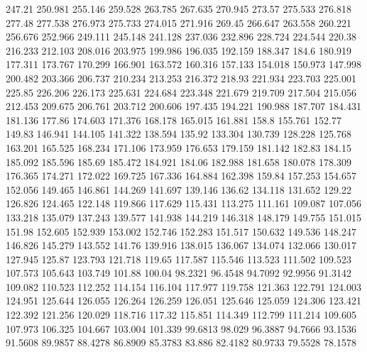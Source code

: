 247.21      250.981      255.146      259.528      263.785      267.635      270.945      273.57      275.533      276.818      277.48      277.538      276.973      275.733      274.015      271.916      269.45      266.647      263.558      260.221      256.676      252.966      249.111      245.148      241.128      237.036      232.896      228.724      224.544      220.38      216.233      212.103      208.016      203.975      199.986      196.035      192.159      188.347      184.6      180.919      177.311      173.767      170.299      166.901      163.572      160.316      157.133      154.018      150.973      147.998      
200.482      203.366      206.737      210.234      213.253      216.372      218.93      221.934      223.703      225.001      225.85      226.206      226.173      225.631      224.684      223.348      221.679      219.709      217.504      215.056      212.453      209.675      206.761      203.712      200.606      197.435      194.221      190.988      187.707      184.431      181.136      177.86      174.603      171.376      168.178      165.015      161.881      158.8      155.761      152.77      149.83      146.941      144.105      141.322      138.594      135.92      133.304      130.739      128.228      125.768      
163.201      165.525      168.234      171.106      173.959      176.653      179.159      181.142      182.83      184.15      185.092      185.596      185.69      185.472      184.921      184.06      182.988      181.658      180.078      178.309      176.365      174.271      172.022      169.725      167.336      164.884      162.398      159.84      157.253      154.657      152.056      149.465      146.861      144.269      141.697      139.146      136.62      134.118      131.652      129.22      126.826      124.465      122.148      119.866      117.629      115.431      113.275      111.161      109.087      107.056      
133.218      135.079      137.243      139.577      141.938      144.219      146.318      148.179      149.755      151.015      151.98      152.605      152.939      153.002      152.746      152.283      151.517      150.632      149.536      148.247      146.826      145.279      143.552      141.76      139.916      138.015      136.067      134.074      132.066      130.017      127.945      125.87      123.793      121.718      119.65      117.587      115.546      113.523      111.502      109.523      107.573      105.643      103.749      101.88      100.04      98.2321      96.4548      94.7092      92.9956      91.3142      
109.082      110.523      112.252      114.154      116.104      117.977      119.758      121.363      122.791      124.003      124.951      125.644      126.055      126.264      126.259      126.051      125.646      125.059      124.306      123.421      122.392      121.256      120.029      118.716      117.32      115.851      114.349      112.799      111.214      109.605      107.973      106.325      104.667      103.004      101.339      99.6813      98.029      96.3887      94.7666      93.1536      91.5608      89.9857      88.4278      86.8909      85.3783      83.886      82.4182      80.9733      79.5528      78.1578      

